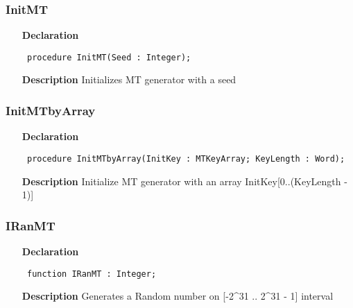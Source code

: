 \documentclass[12pt,a4paper,oneside]{report}
\newcommand{\declarationitem}[1]{\textbf{#1}}
\newcommand{\descriptiontitle}[1]{\textbf{#1}}
\newcommand{\code}[1]{\texttt{#1}}
\begin{document}
\subsubsection{InitMT}
\label{uranmt-InitMT}
\begin{itemize}\item[\declarationitem{Declaration}\hfill]
	\begin{flushleft}
		\code{
			procedure InitMT(Seed : Integer);}
		
	\end{flushleft}
	
	\par
	\item[\descriptiontitle{Description}]
	Initializes MT generator with a seed
	
\end{itemize}
\subsubsection{InitMTbyArray}
\label{uranmt-InitMTbyArray}
\begin{itemize}\item[\declarationitem{Declaration}\hfill]
	\begin{flushleft}
		\code{
			procedure InitMTbyArray(InitKey : MTKeyArray; KeyLength : Word);}
		
	\end{flushleft}
	
	\par
	\item[\descriptiontitle{Description}]
	Initialize MT generator with an array InitKey[0..(KeyLength {-} 1)]
	
\end{itemize}
\subsubsection{IRanMT}
\label{uranmt-IRanMT}
\begin{itemize}\item[\declarationitem{Declaration}\hfill]
	\begin{flushleft}
		\code{
			function IRanMT : Integer;}
		
	\end{flushleft}
	
	\par
	\item[\descriptiontitle{Description}]
	Generates a Random number on [{-}2{\^{}}31 .. 2{\^{}}31 {-} 1] interval
	
\end{itemize}
\end{document}
